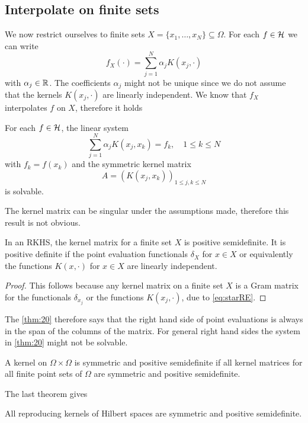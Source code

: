 \documentclass[../lecture-notes.tex]{subfiles}
\begin{document}
\subsection*{Interpolate on finite sets}
We now restrict ourselves to finite sets $X = \{ x_1, \ldots, x_N \} \subseteq \Omega$. For each $f \in \mathcal{H}$ we can write
\[
	f_X(\cdot) = \sum_{j=1}^N \alpha_j K(x_j, \cdot)
\]
with $\alpha_j \in \mathbb{R}$.
The coefficients $\alpha_j$ might not be unique since we do not assume that the kernels $K(x_j, \cdot)$ are linearly independent.
We know that $f_X$ interpolates $f$ on $X$, therefore it holds
\addtocounter{dummythm}{2} %
\begin{theorem} %
\label{thm:20}
For each $f \in \mathcal{H}$, the linear system
\[
	\sum_{j=1}^N \alpha_j K(x_j, x_k) = f_k, \quad 1 \leq k \leq N
\]
with $f_k = f(x_k)$ and the symmetric kernel matrix
\[
	A = (K(x_j, x_k))_{1 \leq j, k \leq N}
\]
is solvable.
\end{theorem}
\begin{remark}
The kernel matrix can be singular under the assumptions made, therefore this result is not obvious.
\end{remark}
\begin{theorem} %
\label{thm:21}
In an \ac{RKHS}, the kernel matrix for a finite set $X$ is positive semidefinite. It is positive definite if the point evaluation functionals $\delta_X$ for $x \in X$ or equivalently the functions $K(x, \cdot)$ for $x \in X$ are linearly independent.
\end{theorem}
\begin{proof}
This follows because any kernel matrix on a finite set $X$ is a Gram matrix for the functionals $\delta_{x_j}$ or the functions $K(x_j, \cdot)$, due to \cref{eq:starRE}.
\end{proof}
\begin{remark}
The \cref{thm:20} therefore says that the right hand side of point evaluations is always in the span of the columns of the matrix.
For general right hand sides the system in \cref{thm:20} might not be solvable.
\end{remark}
\begin{definition} %
\label{thm:22}
A kernel on $\Omega \times \Omega$ is symmetric and positive semidefinite if all kernel matrices for all finite point sets of $\Omega$ are symmetric and positive semidefinite.
\end{definition}
The last theorem gives
\begin{theorem} %
\label{thm:23}
All reproducing kernels of Hilbert spaces are symmetric and positive semidefinite.
\end{theorem}
\end{document}
